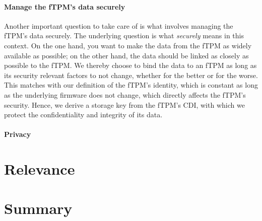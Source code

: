 \paragraph{Manage the fTPM's data securely}
Another important question to take care of is what involves managing the fTPM's data securely.
The underlying question is what \emph{securely} means in this context.
On the one hand, you want to make the data from the fTPM as widely available as possible; on the other hand, the data should be linked as closely as possible to the fTPM\@.
We thereby choose to bind the data to an fTPM as long as its security relevant factors to not change, whether for the better or for the worse.
This matches with our definition of the fTPM's identity, which is constant as long as the underlying firmware does not change, which directly affects the fTPM's security.
Hence, we derive a storage key from the fTPM's \ac{CDI}, with which we protect the confidentiality and integrity of its data.


\paragraph{Privacy}


\section{Relevance}



\section{Summary}

